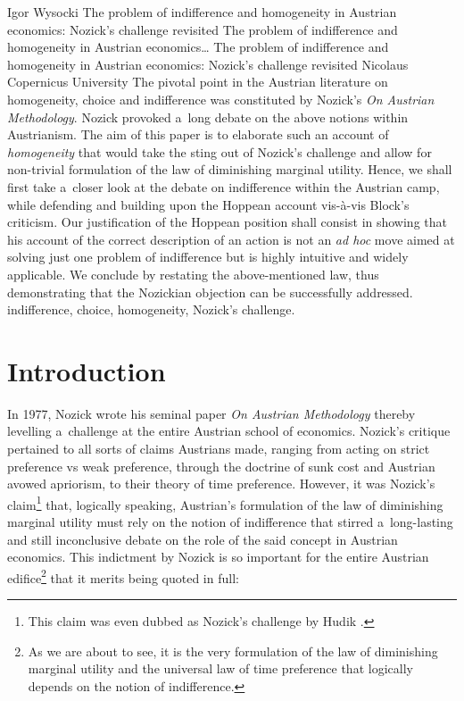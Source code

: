 \begin{artengenv}{Igor Wysocki}
	{The problem of indifference and homogeneity in Austrian economics: Nozick's challenge revisited}
	{The problem of indifference and homogeneity in Austrian economics\ldots}
	{The problem of indifference and homogeneity in Austrian economics: Nozick's challenge revisited}
	{Nicolaus Copernicus University}
	{The pivotal point in the Austrian literature on homogeneity, choice and indifference was constituted by Nozick's \textit{On Austrian Methodology}. Nozick provoked a~long debate on the above notions within Austrianism. The aim of this paper is to elaborate such an account of \textit{homogeneity} that would take the sting out of Nozick's challenge and allow for non-trivial formulation of the law of diminishing marginal utility. Hence, we shall first take a~closer look at the debate on indifference within the Austrian camp, while defending and building upon the Hoppean account vis-à-vis Block's criticism. Our justification of the Hoppean position shall consist in showing that his account of the correct description of an action is not an \textit{ad hoc} move aimed at solving just one problem of indifference but is highly intuitive and widely applicable. We conclude by restating the above-mentioned law, thus demonstrating that the Nozickian objection can be successfully addressed.}
	{indifference, choice, homogeneity, Nozick's challenge.}



\section{Introduction }
\lettrine[loversize=0.13,lines=2,lraise=-0.01,nindent=0em,findent=0.2pt]%
{I}{}n 1977, Nozick wrote his seminal paper \textit{On Austrian Methodology}
\parencite[][]{nozick_austrian_1977} %
 thereby levelling a~challenge at the entire Austrian school of economics. Nozick's critique pertained to all sorts of claims Austrians made, ranging from acting on strict preference vs weak preference, through the doctrine of sunk cost and Austrian avowed apriorism, to their theory of time preference. However, it was Nozick's claim\footnote{This claim was even dubbed as Nozick's challenge by Hudik 
\parencite*[][]{hudik_note_2011}.%
} that, logically speaking, Austrian's formulation of the law of diminishing marginal utility must rely on the notion of indifference that stirred a~long-lasting and still inconclusive debate on the role of the said concept in Austrian economics. This indictment by Nozick 
\parencite*[][pp.370–371]{nozick_austrian_1977} %
 is so important for the entire Austrian edifice\footnote{As we are about to see, it is the very formulation of the law of diminishing marginal utility and the universal law of time preference that logically depends on the notion of indifference.} that it merits being quoted in full:


\end{artengenv}
